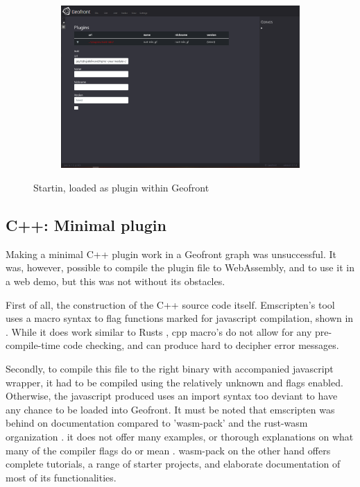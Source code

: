 \begin{figure}
\begin{subfigure}[b]{\linewidth}
    \graphicspath{{../../assets/images/6.1.2}}
    \centering
    \includegraphics[width=\linewidth]{2.PNG}
  \end{subfigure}%
  \caption[Types of \ac{vpl}s]{Startin, loaded as plugin within Geofront}%
  \label{fig:startin-plugin}
  \end{figure}

\subsection{C++: Minimal plugin}  

Making a minimal C++ plugin work in a Geofront graph was unsuccessful.
It was, however, possible to compile the plugin file to WebAssembly, and to use it in a web demo, but this was not without its obstacles. 

First of all, the construction of the C++ source code itself.
Emscripten's  tool uses a macro syntax to flag functions marked for javascript compilation, shown in . 
While it does work similar to Rusts , cpp macro's do not allow for any pre-compile-time code checking, and can produce hard to decipher error messages. 

Secondly, to compile this file to the right binary with accompanied javascript wrapper, it had to be compiled using the relatively unknown  and  flags enabled.
Otherwise, the javascript produced uses an import syntax too deviant to have any chance to be loaded into Geofront. 
It must be noted that emscripten was behind on documentation compared to 'wasm-pack' and the rust-wasm organization \citep*{contributors_wasm-pack_2022}. 
it does not offer many examples, or thorough explanations on what many of the compiler flags do or mean \citep*{emscripten_organization_emscripten_2022}.
wasm-pack on the other hand offers complete tutorials, a range of starter projects, and elaborate documentation of most of its functionalities. 


